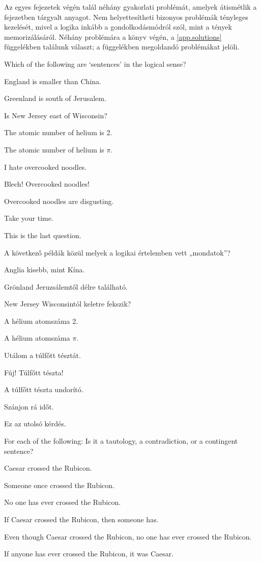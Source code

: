 \practiceproblems
Az egyes fejezetek végén talál néhány gyakorlati problémát, amelyek átismétlik a fejezetben tárgyalt anyagot. Nem helyettesítheti bizonyos problémák tényleges kezelését, mivel a logika inkább a gondolkodásmódról szól, mint a tények memorizálásáról. Néhány problémára a könyv végén, a \ref{app.solutions} függelékben találunk választ; a függelékben megoldandó problémákat \solutions jelöli.

\problempart
Which of the following are `sentences' in the logical sense?
\begin{earg}
\item England is smaller than China.
\item Greenland is south of Jerusalem.
\item Is New Jersey east of Wisconsin?
\item The atomic number of helium is 2.
\item The atomic number of helium is $\pi$.
\item I hate overcooked noodles.
\item Blech! Overcooked noodles!
\item Overcooked noodles are disgusting.
\item Take your time.
\item This is the last question.
\end{earg}

\problempart
A következő példák közül melyek a logikai értelemben vett „mondatok”?
\begin{earg}
\item Anglia kisebb, mint Kína.
\item Grönland Jeruzsálemtől délre található.
\item New Jersey Wisconsintól keletre fekszik?
\item A hélium atomszáma 2.
\item A hélium atomszáma $\pi$.
\item Utálom a túlfőtt tésztát.
\item Fúj! Túlfőtt tészta!
\item A túlfőtt tészta undorító.
\item Szánjon rá időt.
\item Ez az utolsó kérdés.
\end{earg}

\problempart
\label{pr.EnglishTautology}
For each of the following: Is it a tautology, a contradiction, or a contingent sentence?
\begin{earg}
\item Caesar crossed the Rubicon.
\item Someone once crossed the Rubicon.
\item No one has ever crossed the Rubicon.
\item If Caesar crossed the Rubicon, then someone has.
\item Even though Caesar crossed the Rubicon, no one has ever crossed the Rubicon.
\item If anyone has ever crossed the Rubicon, it was Caesar.
\end{earg}

